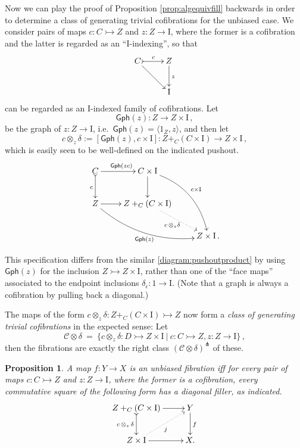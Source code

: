 \documentclass[11pt]{article}
\newcommand{\mono}{\ensuremath{\rightarrowtail}}
\newcommand{\I}{\ensuremath{\mathrm{I}}}
\newtheorem{proposition}[theorem]{Proposition}
\theoremstyle{remark}
\theoremstyle{definition}
\begin{document}
Now we can play the proof of Proposition \ref{prop:algequivfill} backwards in order to determine a class of generating trivial cofibrations for the unbiased case. We consider pairs of maps $c : C\mono Z$ and $z:Z\to\I$, where the former is a cofibration and the latter is regarded as an ``$\I$-indexing'', so that
\[
\xymatrix{
C \ar[rd] \ar@{>->}[r]^{c} & Z  \ar[d]^z \\
& \I
}
\]
can be regarded as an $\I$-indexed family of cofibrations.  Let 
\[
\mathsf{Gph}(z) : Z\to Z\times\I\,,
\]
be the graph of $z : Z\to \I$, i.e.\ $\mathsf{Gph}(z) = \langle 1_Z, z\rangle$, and then let
\[
c \otimes_z\!\delta := [\mathsf{Gph}(z), c\times\I] : Z+_C(C\times\I) \to Z\times \I\,,
\]
which is easily seen to be well-defined on the indicated pushout.
\begin{equation}\label{diagram:unbiasedpushoutproduct}
\xymatrix{
C \ar@{>->}[d]_{c} \ar[r]^{\mathsf{Gph}(zc)} & C\times \I \ar[d] \ar@/^4ex/ [rdd]^{c\times\I}\\
Z \ar@/_4ex/ [rrd]_{\mathsf{Gph}(z)} \ar[r] &  Z +_C (C\times\I) \ar@{.>}[rd]_{c\, \otimes_z \delta} \\
&& Z\times\I\,.
}
\end{equation}

This specification differs from the similar \eqref{diagram:pushoutproduct} by using $\mathsf{Gph}(z)$ for the inclusion $Z\mono Z\times\I$, rather than one of the ``face maps'' associated to the endpoint inclusions $\delta_\epsilon : 1\to\I$. (Note that a graph is always a cofibration by pulling back a diagonal.)

The maps of the form $c\otimes_z\delta : Z +_C (C\times\I) \mono Z$  now form a \emph{class of generating trivial cofibrations} in the expected sense: Let 
\[
\mathcal{C}\otimes\delta\ =\ \{ c \otimes_z \delta : D \mono Z \times \I\ |\ c : C\mono Z, z:Z\to\I \}\,,
\]
then the fibrations are exactly the right class $(\mathcal{C}\otimes\delta)^{\pitchfork}$ of these.
\begin{proposition}
A map $f: Y\to X$ is an unbiased  fibration iff for every pair of maps $c : C\mono Z$ and $z:Z\to\I$, where the former is a cofibration, every commutative square of the following form has a diagonal filler, as indicated.
\begin{equation}\label{diagram:unbiasedfibration}
\xymatrix{
Z +_C (C\times\I) \ar@{>->}[d]_{c\, \otimes_z\, \delta} \ar[r] & Y \ar[d]^f \\
Z\times \I \ar@{.>}[ru]_{j} \ar[r] & X.
}
\end{equation}
\end{proposition}
\end{document}

